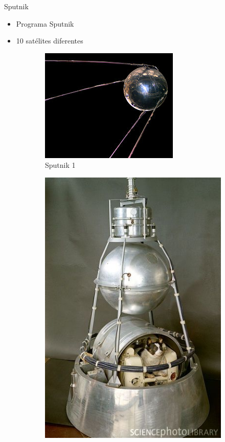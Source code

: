 

\begin{frame}[fragile]{ Sputnik}
\vspace{8px}
\pause
{}
\begin{block}{}
	\begin{itemize}
		\item Programa Sputnik
		\pause
		\item 10 satélites diferentes
	\end{itemize}
\end{block}
\begin{figure}
		\centering
		\pause
		\begin{subfigure}{0.33\textwidth}
			\centering
			\includegraphics[scale=1.3]{./EtapaPrimeriza/imagenes/s1.jpg}
			\caption{Sputnik 1}
		\end{subfigure}
		\pause
		\begin{subfigure}{0.33\textwidth}
			\centering
			\includegraphics[scale=1.0]{./EtapaPrimeriza/imagenes/s2.jpg}

\end{subfigure}
\end{figure}
\end{frame}
